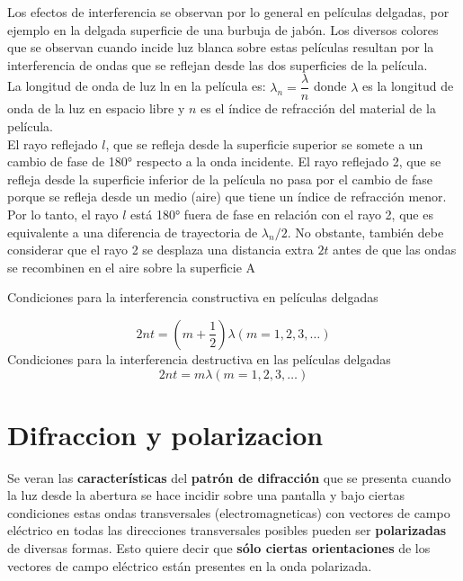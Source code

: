 \documentclass[10pt]{article}
\begin{document}
Los efectos de interferencia se observan por lo general en películas delgadas, por ejemplo
en la delgada superficie de una burbuja de jabón.
Los diversos colores que se observan cuando incide luz blanca sobre estas películas resultan por la interferencia de ondas que se reflejan desde las dos superficies de la película.\\
 La longitud de onda de luz ln en la película es: $\lambda_n = \dfrac{\lambda}{n}$ donde $\lambda$ es la longitud de onda de la luz en espacio libre y $n$ es el índice de refracción del material de la película.\\
 
El rayo reflejado $l$, que se refleja desde la superficie superior se somete a un cambio de fase de 180° respecto a la onda incidente. El rayo reflejado 2, que se refleja desde la superficie inferior de la película no pasa por el cambio de fase porque
se refleja desde un medio (aire) que tiene un índice de refracción menor. Por lo tanto, el
rayo $l$ está 180° fuera de fase en relación con el rayo 2, que es equivalente a una diferencia
de trayectoria de $\lambda_n/2$. No obstante, también debe considerar que el rayo 2 se desplaza una
distancia extra $2t$ antes de que las ondas se recombinen en el aire sobre la superficie A\\
\linebreak

Condiciones para la interferencia constructiva en películas delgadas

\begin{equation*}
	2nt = (m+ \frac{1}{2})\lambda (m=1,2,3,\dots)
\end{equation*}
Condiciones para la interferencia destructiva en las películas delgadas
\begin{equation*}
	2nt = m\lambda (m=1,2,3,\dots)
\end{equation*}
\section{Difraccion y polarizacion}
Se veran las \textbf{características} del \textbf{patrón de difracción} que se presenta cuando
la luz desde la abertura se hace incidir sobre una pantalla y bajo ciertas condiciones estas ondas transversales (electromagneticas) con vectores de campo eléctrico en todas las direcciones transversales posibles pueden ser \textbf{polarizadas} de diversas formas. Esto quiere decir que \textbf{sólo ciertas orientaciones} de los vectores de campo eléctrico están presentes en la onda polarizada.
\end{document}
